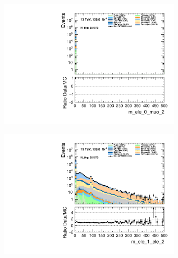 \begin{figure}
\begin{subfigure}{.49\textwidth}
        \includegraphics[width=\textwidth]{Figures/MC_Data_comp/m_ele_0_muo_2.pdf}
        \caption{ }
        \label{fig:fep}
    \end{subfigure}
    \hfill
    \begin{subfigure}{.49\textwidth}
        \includegraphics[width=\textwidth]{Figures/MC_Data_comp/m_ele_1_ele_2.pdf}
        \caption{ }
        \label{fig:fe}
    \end{subfigure}
    \hfill       
    \caption{}
    \label{fig:t}
\end{figure}

